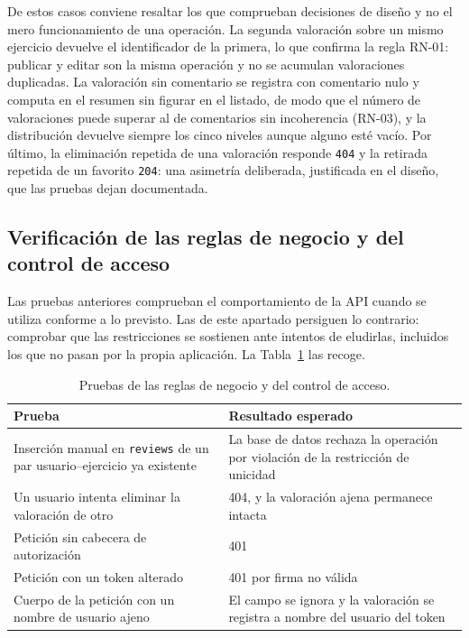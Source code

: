 \documentclass[12pt,a4paper,twoside,openright]{book}
\begin{document}
    De estos casos conviene resaltar los que comprueban decisiones de diseño y
    no el mero funcionamiento de una operación. La segunda valoración sobre un
    mismo ejercicio devuelve el identificador de la primera, lo que confirma la
    regla RN-01: publicar y editar son la misma operación y no se acumulan
    valoraciones duplicadas. La valoración sin comentario se registra con
    comentario nulo y computa en el resumen sin figurar en el listado, de modo
    que el número de valoraciones puede superar al de comentarios sin
    incoherencia (RN-03), y la distribución devuelve siempre los cinco niveles
    aunque alguno esté vacío. Por último, la eliminación repetida de una
    valoración responde \texttt{404} y la retirada repetida de un favorito
    \texttt{204}: una asimetría deliberada, justificada en el diseño, que las
    pruebas dejan documentada.

    \subsection{Verificación de las reglas de negocio y del control de acceso}

    Las pruebas anteriores comprueban el comportamiento de la API cuando se
    utiliza conforme a lo previsto. Las de este apartado persiguen lo contrario:
    comprobar que las restricciones se sostienen ante intentos de eludirlas,
    incluidos los que no pasan por la propia aplicación. La
    Tabla~\ref{tab:pruebas-social-reglas} las recoge.

    \begin{table}[htbp]
        \centering
        \small
        \begin{tabular}{p{7cm} p{6cm}}
            \toprule
            \textbf{Prueba} & \textbf{Resultado esperado} \\
            \midrule
            Inserción manual en \texttt{reviews} de un par usuario--ejercicio ya existente & La base de datos rechaza la operación por violación de la restricción de unicidad \\
            Un usuario intenta eliminar la valoración de otro & 404, y la valoración ajena permanece intacta \\
            Petición sin cabecera de autorización & 401 \\
            Petición con un token alterado & 401 por firma no válida \\
            Cuerpo de la petición con un nombre de usuario ajeno & El campo se ignora y la valoración se registra a nombre del usuario del token \\
            \bottomrule
        \end{tabular}
        \caption{Pruebas de las reglas de negocio y del control de acceso.}
        \label{tab:pruebas-social-reglas}
    \end{table}
\end{document}
